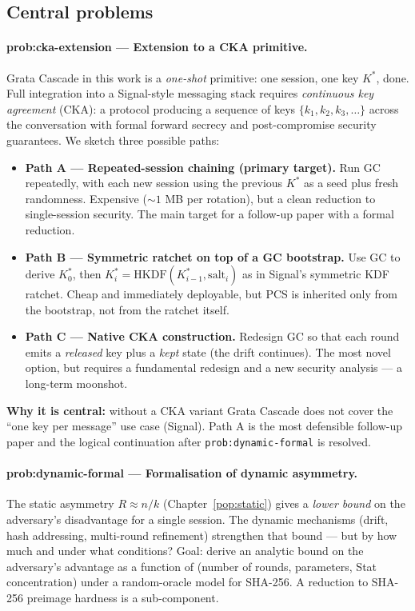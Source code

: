 \documentclass[11pt,a4paper]{article}
\begin{document}
\subsection{Central problems}

\paragraph{prob:cka-extension --- Extension to a CKA primitive.} Grata Cascade in this work is a \emph{one-shot} primitive: one session, one key $K^*$, done. Full integration into a Signal-style messaging stack requires \emph{continuous key agreement} (CKA): a protocol producing a sequence of keys $\{k_1, k_2, k_3, \ldots\}$ across the conversation with formal forward secrecy and post-compromise security guarantees. We sketch three possible paths:

\begin{itemize}[leftmargin=*]
\item \textbf{Path A --- Repeated-session chaining (primary target).} Run GC repeatedly, with each new session using the previous $K^*$ as a seed plus fresh randomness. Expensive ($\sim 1$ MB per rotation), but a clean reduction to single-session security. The main target for a follow-up paper with a formal reduction.
\item \textbf{Path B --- Symmetric ratchet on top of a GC bootstrap.} Use GC to derive $K^*_0$, then $K^*_i = \mathrm{HKDF}(K^*_{i-1}, \mathrm{salt}_i)$ as in Signal's symmetric KDF ratchet. Cheap and immediately deployable, but PCS is inherited only from the bootstrap, not from the ratchet itself.
\item \textbf{Path C --- Native CKA construction.} Redesign GC so that each round emits a \emph{released} key plus a \emph{kept} state (the drift continues). The most novel option, but requires a fundamental redesign and a new security analysis --- a long-term moonshot.
\end{itemize}

\textbf{Why it is central:} without a CKA variant Grata Cascade does not cover the ``one key per message'' use case (Signal). Path A is the most defensible follow-up paper and the logical continuation after \texttt{prob:dynamic-formal} is resolved.

\paragraph{prob:dynamic-formal --- Formalisation of dynamic asymmetry.} The static asymmetry $R \approx n/k$ (Chapter~\ref{pop:static}) gives a \emph{lower bound} on the adversary's disadvantage for a single session. The dynamic mechanisms (drift, hash addressing, multi-round refinement) strengthen that bound --- but by how much and under what conditions? Goal: derive an analytic bound on the adversary's advantage as a function of (number of rounds, parameters, Stat concentration) under a random-oracle model for SHA-256. A reduction to SHA-256 preimage hardness is a sub-component.
\end{document}
